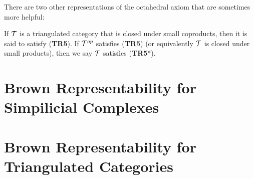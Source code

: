 \documentclass[12pt]{article}
\begin{document}
\begin{rmk}
There are two other representations of the octahedral axiom that are sometimes more helpful:
\begin{center}
\end{center}

\begin{center}
\end{center}
\end{rmk}
\begin{defn}
  If $\mathcal{T}$ is a triangulated category that is closed under small coproducts, then it is said to satisfy (\textbf{TR5}). If $\mathcal{T}^{op}$ satisfies (\textbf{TR5}) (or equivalently $\mathcal{T}$ is closed under small products), then we say $\mathcal{T}$ satisfies (\textbf{TR5}*).
\end{defn}




\section{Brown Representability for Simpilicial Complexes}

\section{Brown Representability for Triangulated Categories}

\medskip

\printbibliography
\end{document}
